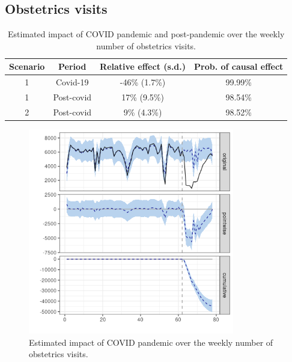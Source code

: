 \documentclass[9pt]{osa-supplemental-document}
\begin{document}
\subsection{Obstetrics visits}\label{obst}
\begin{table}[H]\caption{Estimated impact of COVID pandemic and post-pandemic over the weekly number of obstetrics visits.}
  \centering  
  \begin{tabular}{ |c|c|c|c| }
      \hline
   \textbf{Scenario} & \textbf{Period} & \textbf{Relative effect (s.d.)} & \textbf{Prob. of causal effect} \\ 
   \hline
   1 & Covid-19 & -46\% (1.7\%) & 99.99\% \\  
   1 & Post-covid & 17\% (9.5\%) & 98.54\% \\
   \hline   
   2 & Post-covid & 9\% (4.3\%) & 98.52\% \\
   \hline
  \end{tabular}
\end{table}

\begin{center}
  \begin{figure}[H]
    \includegraphics[width=9cm]{obstetrics_covid.png}\caption{Estimated impact of COVID pandemic over the weekly number of obstetrics visits.}
  \end{figure}
  \end{center}
  
\end{document}
